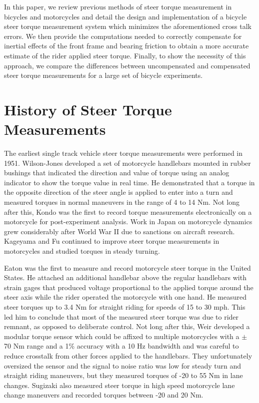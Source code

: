 \documentclass[10pt]{article}
\begin{document}
In this paper, we review previous methods of steer torque measurement in
bicycles and motorcycles and detail the design and implementation of a bicycle
steer torque measurement system which minimizes the aforementioned cross talk
errors. We then provide the computations needed to correctly compensate for
inertial effects of the front frame and bearing friction to obtain a more
accurate estimate of the rider applied steer torque. Finally, to show the
necessity of this approach, we compare the differences between uncompensated
and compensated steer torque measurements for a large set of bicycle
experiments.

\section*{History of Steer Torque Measurements}

The earliest single track vehicle steer torque measurements were performed in
1951. Wilson-Jones \cite{Wilson-Jones1951} developed a set of motorcycle
handlebars mounted in rubber bushings that indicated the direction and value of
torque using an analog indicator to show the torque value in real time. He
demonstrated that a torque in the opposite direction of the steer angle is
applied to enter into a turn and measured torques in normal maneuvers in
the range of 4 to 14 Nm. Not long after this, Kondo \cite{Kondo1955} was the first
to record torque measurements electronically on a motorcycle for
post-experiment analysis. Work in Japan on motorcycle dynamics grew
considerably after World War II due to sanctions on aircraft research. Kageyama
\cite{Kageyama1959} and Fu \cite{Fu1965} continued to improve steer torque
measurements in motorcycles and studied torques in steady turning.


Eaton \cite{Eaton1973} was the first to measure and record motorcycle steer
torque in the United States. He attached an additional handlebar above the regular
handlebars with strain gages that produced voltage proportional to the applied
torque around the steer axis while the rider operated the motorcycle with one
hand. He measured steer torques up to 3.4 Nm for straight riding for speeds of
15 to 30 mph. This led him to conclude that most of the measured steer torque
was due to rider remnant, as opposed to deliberate control. Not long after
this, Weir \cite{Weir1979a} developed a modular torque sensor which could be
affixed to multiple motorcycles with a $\pm$ 70 Nm range and a 1\% accuracy
with a 10 Hz bandwidth and was careful to reduce crosstalk from other forces
applied to the handlebars. They unfortunately oversized the sensor and the
signal to noise ratio was low for steady turn and straight riding maneuvers,
but they measured torques of -20 to 55 Nm in lane changes. Sugizaki
\cite{Sugizaki1988} also measured steer torque in high speed motorcycle lane
change maneuvers and recorded torques between -20 and 20 Nm.
\end{document}
